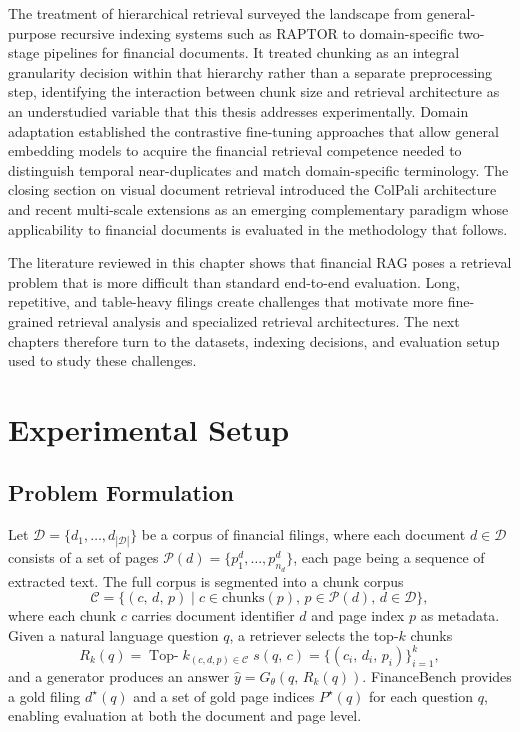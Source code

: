 \documentclass[12pt,twoside,maitrise]{dms}
\theoremstyle{definition}
\numberwithin{equation}{section}
\numberwithin{table}{chapter}
\numberwithin{figure}{chapter}
\begin{document}
The treatment of hierarchical retrieval surveyed the landscape from general-purpose
recursive indexing systems such as RAPTOR to domain-specific two-stage pipelines for
financial documents. It treated chunking as an integral granularity decision within that
hierarchy rather than a separate preprocessing step, identifying the interaction between
chunk size and retrieval architecture as an understudied variable that this thesis
addresses experimentally. Domain adaptation
established the contrastive fine-tuning approaches that allow general embedding models to
acquire the financial retrieval competence needed to distinguish temporal near-duplicates
and match domain-specific terminology. The closing section on visual document retrieval
introduced the ColPali architecture and recent multi-scale extensions as an emerging
complementary paradigm whose applicability to financial documents is evaluated in the
methodology that follows.

The literature reviewed in this chapter shows that financial RAG poses a retrieval problem that is more difficult than standard end-to-end evaluation. Long, repetitive, and table-heavy filings create challenges that motivate more fine-grained retrieval analysis and specialized retrieval architectures. The next chapters therefore turn to the datasets, indexing decisions, and evaluation setup used to study these challenges.



\chapter{Experimental Setup}
\label{chap:setup}

\section{Problem Formulation}
\label{sec:prob_form}
Let $\mathcal{D} = \{d_1, \ldots, d_{|\mathcal{D}|}\}$ be a corpus of financial filings,
where each document $d \in \mathcal{D}$ consists of a set of pages
$\mathcal{P}(d) = \{p^d_1, \ldots, p^d_{n_d}\}$, each page being a sequence of
extracted text. The full corpus is segmented into a chunk corpus
\begin{equation}
  \mathcal{C} = \{(c,\, d,\, p) \mid c \in \text{chunks}(p),\, p \in \mathcal{P}(d),\,
  d \in \mathcal{D}\},
\end{equation}
where each chunk $c$ carries document identifier $d$ and page index $p$ as metadata.
Given a natural language question $q$, a retriever selects the top-$k$ chunks
\begin{equation}
  R_k(q) = \operatorname{Top\text{-}}k_{(c,d,p)\in\mathcal{C}}\; s(q,\, c)
  = \{(c_i,\, d_i,\, p_i)\}_{i=1}^{k},
  \label{eq:retriever}
\end{equation}
and a generator produces an answer $\hat{y} = G_\theta(q,\, R_k(q))$. FinanceBench
provides a gold filing $d^\star(q)$ and a set of gold page indices $P^\star(q)$ for
each question $q$, enabling evaluation at both the document and page level.
\end{document}

